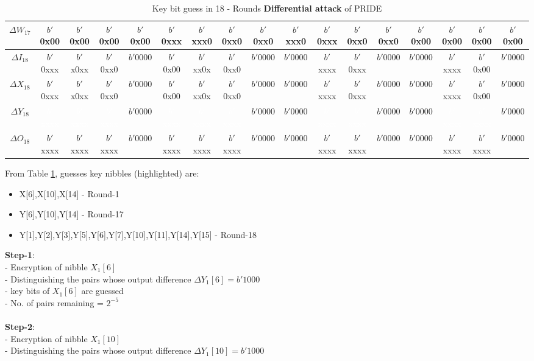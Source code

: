 \documentclass{transcrypto}
\newcommand{\xxxx}{\cellcolor{mypink2}\textcolor{white}{$b'$xxxx}}
\begin{document}
\begin{center}
\begin{table}[h]
{\begin{tabular*}{1.765\textwidth}{|c|c|c|c|c|c|c|c|c|c|c|c|c|c|c|c|c|}
			$ \Delta W_{17} $ & $b'$0x00 & $b'$0x00 & $b'$0x00 & $b'$0x00 & $b'$0xxx & $b'$xxx0 & $b'$0xx0 & $b'$0xx0 & $b'$xxx0 & $b'$0xxx & $b'$0xx0 & $b'$0xx0 & $b'$0x00 & $b'$0x00 & $b'$0x00 & $b'$0x00    \\ \hline 
			$ \Delta I_{18} $ & $b'$0xxx & $b'$x0xx & $b'$0xx0 & $b'0000$ & $b'$0x00 & $b'$xx0x & $b'$0xx0 & $b'0000$ & $b'0000$ & $b'$xxxx & $b'$0xxx & $b'0000$ & $b'0000$ & $b'$xxxx & $b'$0x00 & $b'0000$    \\ \hline 
			$ \Delta X_{18} $ & $b'$0xxx & $b'$x0xx & $b'$0xx0 & $b'0000$ & $b'$0x00 & $b'$xx0x & $b'$0xx0 & $b'0000$ & $b'0000$ & $b'$xxxx & $b'$0xxx & $b'0000$ & $b'0000$ & $b'$xxxx & $b'$0x00 & $b'0000$    \\ \hline 
			$ \Delta Y_{18} $ & \xxxx & \xxxx & \xxxx & $b'0000$ & \xxxx & \xxxx & \xxxx & $b'0000$ & $b'0000$ & \xxxx & \xxxx & $b'0000$ & $b'0000$ & \xxxx & \xxxx & $b'0000$    \\ \hline 
			$ \Delta O_{18} $ & $b'$xxxx & $b'$xxxx & $b'$xxxx & $b'0000$ & $b'$xxxx & $b'$xxxx & $b'$xxxx & $b'0000$ & $b'0000$ & $b'$xxxx & $b'$xxxx & $b'0000$ & $b'0000$ & $b'$xxxx & $b'$xxxx & $b'0000$    \\ \hline
		\end{tabular*}}
		\caption{Key bit guess in 18 - Rounds \textbf{Differential attack} of PRIDE}
		\label{guessed}
	\end{table}
	From Table \ref{guessed}, guesses key nibbles (highlighted) are:
	\begin{itemize}
		\item X[6],X[10],X[14] - Round-1 
		\item Y[6],Y[10],Y[14] - Round-17
		\item Y[1],Y[2],Y[3],Y[5],Y[6],Y[7],Y[10],Y[11],Y[14],Y[15] - Round-18
	\end{itemize}
	\end{center}
	\textbf{Step-1}: \\
	- Encryption of nibble $ X_1[6] $\\
	- Distinguishing the pairs whose output difference $ \Delta Y_1[6] = b'1000 $\\
	- key bits of $ X_1[6] $ are guessed\\
	- No. of pairs remaining = $ 2^{-5} $ \\ \\
	\textbf{Step-2}: \\
	- Encryption of nibble $ X_1[10] $\\
	- Distinguishing the pairs whose output difference $ \Delta Y_1[10] = b'1000 $\\
\end{document}
